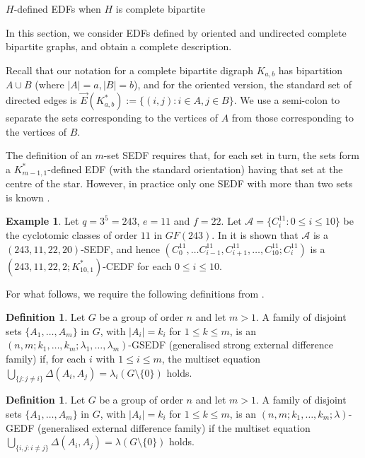 \documentclass[12pt, a4paper]{article}
\theoremstyle{definition}
\newtheorem{example}[theorem]{Example}
\newtheorem{definition}[theorem]{Definition}
\newcommand{\E}{\overrightarrow{E}}
\begin{document}
\begin{section}{$H$-defined EDFs when $H$ is complete bipartite}

In this section, we consider EDFs defined by oriented and undirected complete bipartite graphs, and obtain a complete description.

Recall that our notation for a complete bipartite digraph $K_{a,b}$ has bipartition $A \cup B$ (where $|A|=a, |B|=b$), and for the oriented version, the standard set of directed edges is $\E(K_{a,b}^*):=\{ (i,j): i \in A, j \in B \}$.  We use a semi-colon to separate the sets corresponding to the vertices of $A$ from those corresponding to the vertices of $B$.


The definition of an $m$-set SEDF requires that, for each set in turn, the sets form a $K_{m-1,1}^*$-defined EDF (with the standard orientation) having that set at the centre of the star.  However, in practice only one SEDF with more than two sets is known \cite{JedLi, Wenetal}.

\begin{example}
Let $q=3^5=243$, $e=11$ and $f=22$.  Let $\mathcal{A}=\{C_i^{11}: 0 \leq i \leq 10 \}$ be the cyclotomic classes of order $11$ in $GF(243)$. In \cite{Wenetal} it is shown that $\mathcal{A}$ is a $(243,11,22,20)$-SEDF, and hence $(C^{11}_0,\ldots C^{11}_{i-1}, C^{11}_{i+1},\ldots, C^{11}_{10}; C^{11}_i)$ is a $(243,11,22,2; K_{10,1}^*)$-CEDF for each $0 \leq i \leq 10$.
\end{example}

For what follows, we require the following definitions from \cite{PatSti1}.

\begin{definition}\label{def:GSEDF}
Let $G$ be a group of order $n$ and let $m>1$.  A family of disjoint sets $\{A_1, \ldots, A_m\}$ in $G$, with $|A_i|=k_i$ for $1 \leq k \leq m$, is an $(n,m; k_1,\ldots,k_m; \lambda_1, \ldots, \lambda_m)$-GSEDF (generalised strong external difference family) if, for each $i$ with $1 \leq i \leq m$, the multiset equation
$ \bigcup_{\{j: j \neq i\}} \Delta(A_i,A_j)= \lambda_i(G \setminus \{0\})$ holds.
\end{definition} 

\begin{definition}\label{def:GEDF}
Let $G$ be a group of order $n$ and let $m>1$.  A family of disjoint sets $\{A_1, \ldots, A_m\}$ in $G$, with $|A_i|=k_i$ for $1 \leq k \leq m$, is an $(n,m; k_1,\ldots,k_m; \lambda)$-GEDF (generalised external difference family) if the multiset equation
$ \bigcup_{\{i,j: i \neq j\}} \Delta(A_i,A_j)= \lambda(G \setminus \{0\})$ holds.
\end{definition} 


\end{section}
\end{document}
